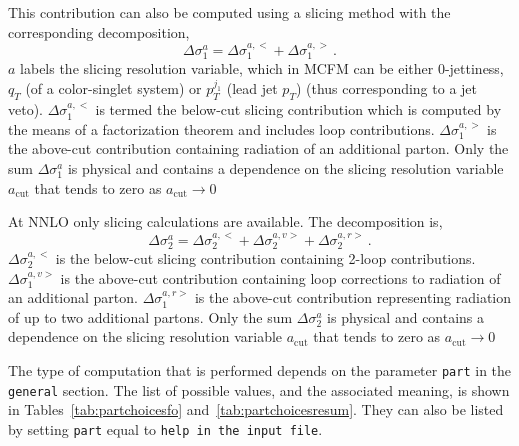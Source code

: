 This contribution can also be computed using a slicing method with the
corresponding decomposition,
\begin{equation}
\Delta\sigma_1^a = \Delta\sigma_1^{a,<} + \Delta\sigma_1^{a, >} \,.
\end{equation}
$a$ labels the slicing resolution variable, which in MCFM can be either
0-jettiness, $q_T$ (of a color-singlet system) or $p_T^{j_1}$ (lead jet $p_T$)
(thus corresponding to a jet veto).
$\Delta\sigma_1^{a,<}$ is termed the below-cut slicing contribution which is
computed by the means of a factorization theorem and includes loop contributions.
$\Delta\sigma_1^{a,>}$ is the above-cut contribution containing radiation of
an additional parton.
Only the sum $\Delta\sigma_1^a$ is physical and contains a dependence on
the slicing resolution variable $a_{\text{cut}}$ that tends to zero as
$a_{\text{cut}} \to 0$

At NNLO only slicing calculations are available.  The decomposition is,
\begin{equation}
\Delta\sigma_2^a = \Delta\sigma_2^{a,<} + \Delta\sigma_2^{a, v>}  + \Delta\sigma_2^{a, r>} \,.
\end{equation}
$\Delta\sigma_2^{a,<}$ is the below-cut slicing contribution containing 2-loop
contributions.
$\Delta\sigma_1^{a, v>}$ is the above-cut contribution containing loop corrections
to radiation of an additional parton.
$\Delta\sigma_1^{a, r>}$ is the above-cut contribution representing
radiation of up to two additional partons.
Only the sum $\Delta\sigma_2^a$ is physical and contains a dependence on
the slicing resolution variable $a_{\text{cut}}$ that tends to zero as
$a_{\text{cut}} \to 0$

The type of computation that is performed depends on the parameter
\texttt{part} in the \texttt{general} section.
The list of possible values,
and the associated meaning, is shown in Tables~\ref{tab:partchoicesfo}
and~\ref{tab:partchoicesresum}.  They can also be listed by
setting \texttt{part} equal to \texttt{help in the input file}.


